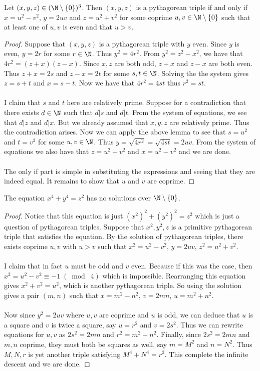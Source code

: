 \documentclass[a4paper]{article}
\begin{document}
\begin{thm}{}{} Let $(x,y,z)\in(\N\setminus\{0\})^3$. Then $(x,y,z)$ is a pythagorean triple if and only if $x=u^2-v^2$, $y=2uv$ and $z=u^2+v^2$ for some coprime $u,v\in\N\setminus\{0\}$ such that at least one of $u,v$ is even and that $u>v$. \tcbline
\begin{proof}
Suppose that $(x,y,z)$ is a pythagorean triple with $y$ even. Since $y$ is even, $y=2r$ for some $r\in\N$. Thus $y^2=4r^2$. From $y^2=z^2-x^2$, we have that $4r^2=(z+x)(z-x)$. Since $x,z$ are both odd, $z+x$ and $z-x$ are both even. Thus $z+x=2s$ and $z-x=2t$ for some $s,t\in\N$. Solving the the system gives $z=s+t$ and $x=s-t$. Now we have that $4r^2=4st$ thus $r^2=st$. \\~\\
I claim that $s$ and $t$ here are relatively prime. Suppose for a contradiction that there exists $d\in\N$ such that $d|s$ and $d|t$. From the system of equations, we see that $d|z$ and $d|x$. But we already assumed that $x,y,z$ are relatively prime. Thus the contradiction arises. Now we can apply the above lemma to see that $s=u^2$ and $t=v^2$ for some $u,v\in\N$. Thus $y=\sqrt{4r^2}=\sqrt{4st}=2uv$. From the system of equations we also have that $z=u^2+v^2$ and $x=u^2-v^2$ and we are done. \\~\\
The only if part is simple in substituting the expressions and seeing that they are indeed equal. It remains to show that $u$ and $v$ are coprime. 
\end{proof}
\end{thm}

\begin{thm}{}{} The equation $x^4+y^4=z^2$ has no solutions over $\N\setminus\{0\}$. \tcbline
\begin{proof}
Notice that this equation is just $(x^2)^2+(y^2)^2=z^2$ which is just a question of pythagorean triples. Suppose that $x^2,y^2,z$ is a primitive pythagorean triple that satisfies the equation. By the solution of pythagorean triples, there exists coprime $u,v$ with $u>v$ such that $x^2=u^2-v^2$, $y=2uv$, $z^2=u^2+v^2$. \\~\\
I claim that in fact $u$ must be odd and $v$ even. Because if this was the case, then $x^2=u^2-v^2\equiv -1\;(\bmod\;4)$ which is impossible. Rearranging this equation gives $x^2+v^2=u^2$, which is another pythagorean triple. So using the solution gives a pair $(m,n)$ such that $x=m^2-n^2$, $v=2mn$, $u=m^2+n^2$. \\~\\
Now since $y^2=2uv$ where $u,v$ are coprime and $u$ is odd, we can deduce that $u$ is a square and $v$ is twice a square, say $u=r^2$ and $v=2s^2$. Thus we can rewrite equations for $u,v$ as $2s^2=2mn$ and $r^2=m^2+n^2$. Finally, since $2s^2=2mn$ and $m,n$ coprime, they must both be squares as well, say $m=M^2$ and $n=N^2$. Thus $M,N,r$ is yet another triple satisfying $M^4+N^4=r^2$. This complete the infinite descent and we are done. 
\end{proof}
\end{thm}
\end{document}
